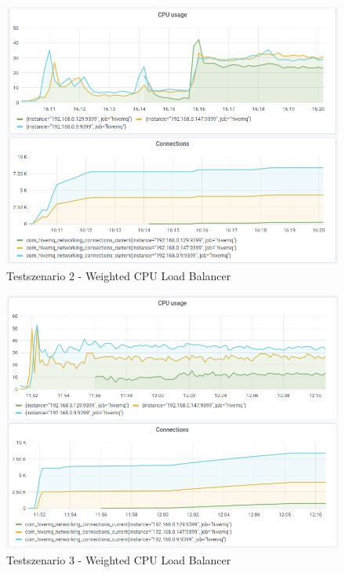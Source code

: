 \begin{figure}
    \centering
    \includegraphics[scale=0.8]{images/s2_cpu.png}
    \caption{Testszenario 2 - Weighted CPU Load Balancer}
    \label{fig:s2-cpu}
\end{figure}
\begin{figure}
    \centering
    \includegraphics[scale=0.8]{images/s3_cpu.png}
    \caption{Testszenario 3 - Weighted CPU Load Balancer}
    \label{fig:s3-cpu}
\end{figure}

